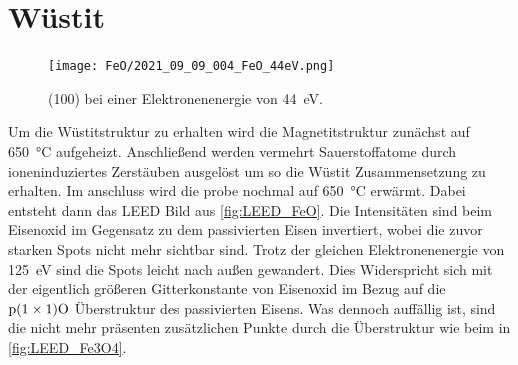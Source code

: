     \section{Wüstit}
        \begin{figure}
            \centering
            \texttt{[image: FeO/2021\_09\_09\_004\_FeO\_44eV.png]}
            \caption{ (100) bei einer Elektronenenergie von \SI{44}{\electronvolt}.}
            \label{fig:LEED_FeO}
        \end{figure}
        Um die Wüstitstruktur zu erhalten wird die Magnetitstruktur zunächst auf \SI{650}{\celsius} aufgeheizt.
        Anschließend werden vermehrt Sauerstoffatome durch ioneninduziertes Zerstäuben ausgelöst um so die Wüstit Zusammensetzung zu erhalten.
        Im anschluss wird die probe nochmal auf \SI{650}{\celsius} erwärmt.
        Dabei entsteht dann das LEED Bild aus \autoref{fig:LEED_FeO}.
        Die Intensitäten sind beim Eisenoxid im Gegensatz zu dem passivierten Eisen invertiert, wobei die zuvor starken Spots nicht mehr sichtbar sind.
        Trotz der gleichen Elektronenenergie von \SI{125}{\electronvolt} sind die Spots leicht nach außen gewandert.
        Dies Widerspricht sich mit der eigentlich größeren Gitterkonstante von Eisenoxid im Bezug auf die $\text{p}(1 \times 1)\ce{O}$ Überstruktur des passivierten Eisens.
        Was dennoch auffällig ist, sind die nicht mehr präsenten zusätzlichen Punkte durch die Überstruktur wie beim  in \autoref{fig:LEED_Fe3O4}.

